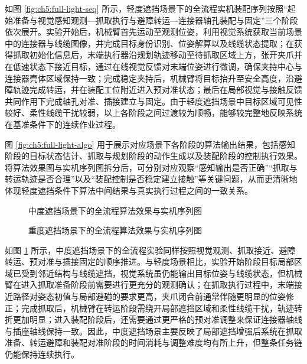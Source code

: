如图 \ref{fig:ch5:full-light-seq} 所示，轻度遮挡场景下的全流程实机装配序列按照“起始准备与视觉感知观测—抓取执行与避障转运—连接器轴孔装配与固定”三个阶段依次展开。实验开始后，机械臂首先运动至观测位姿，利用视觉系统获取当前场景中的连接器与线缆图像，并完成目标身份识别、位姿解算以及线缆状态提取；在获得抓取初始化信息后，末端执行器沿规划轨迹移动至待抓取区域上方，张开夹爪并在低速状态下接近目标，通过在线视觉反馈对末端位姿进行微调，确保夹持中心与连接器壳体区域保持一致；完成稳定夹持后，机械臂将目标抬升至安全高度，沿避障轨迹完成转运，并在装配工位附近进入预对准状态；最后在局部视觉与接触反馈共同作用下完成轴孔对准、插接建立与固定。由于轻度遮挡场景中目标区域可见性较好、柔性线缆干扰较弱，以上各阶段之间过渡较为顺畅，能够较完整地反映系统在基准条件下的连续作业过程。

图 \ref{fig:ch5:full-light-algo} 用于展示对应场景下各阶段的算法输出结果，包括感知阶段的目标状态估计、抓取与规划阶段的动作生成以及装配阶段的控制执行效果。将算法效果图与实机序列图拆分后，可分别对应观察“感知输出是否正确”“抓取与转运轨迹是否合理”以及“装配控制是否稳定建立接触”等关键问题，从而更清晰地体现轻度遮挡条件下算法中间结果与真实执行过程之间的一致关系。

\begin{figure}[htbp]
  \centering
  \caption{中度遮挡场景下的全流程算法效果与实机序列图}
  \label{fig:ch5:full-medium}
\end{figure}

\begin{figure}[htbp]
  \centering
  \caption{重度遮挡场景下的全流程算法效果与实机序列图}
  \label{fig:ch5:full-heavy}
\end{figure}

如图 \ref{fig:ch5:full-medium} 所示，中度遮挡场景下的全流程实验同样按照视觉观测、抓取接近、避障转运、预对准与插接固定的顺序推进。与轻度场景相比，实验开始阶段目标局部区域已受到邻近结构与线缆遮挡，视觉系统虽仍能输出目标位姿与线缆状态，但机械臂在进入抓取准备阶段前需要进行更充分的观测确认；在抓取执行过程中，末端接近路径对姿态初值与局部避碰的要求更高，夹爪闭合前通常伴随更明显的位姿修正；完成抓取后，机械臂在转运阶段需绕开局部遮挡区域和柔性线缆干扰，轨迹转折更加明显；进入装配阶段后，还需要通过更严格的预对准调整来保证连接器轴线与插座轴线保持一致。因此，中度遮挡场景主要反映了局部遮挡增强后系统在抓取准备、转运避障和装配对准阶段的时间消耗与调整难度均有所上升，但整条任务链仍能保持连续执行。

